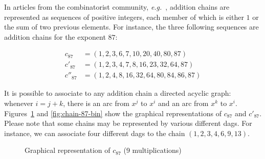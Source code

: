 In articles from the combinatorist  community, 
\emph{e.g.}~\cite{brauer1939,DBLP:journals/ipl/BerstelB87},  addition chains 
are represented as sequences of positive integers, each member of which 
is either $1$ or  the sum of two previous elements.
For instance, the three following sequences are addition chains for the exponent $87$:

\begin{align}
c_{87} &= (1,2,3,6,7,10,20,40,80,87) \\
c'_{87}&=(1,2,3,4,7,8,16,23,32,64,87) \\
c''_{87}&=(1,2,4,8,16,32,64,80,84,86,87)
\end{align}

It is possible to associate to any addition chain a directed acyclic graph:
whenever $i=j+k$, there is an arc from $x^j$ to $x^i$ and an arc
from $x^k$ to $x^i$. Figures~\ref{fig:chain-87-eucl}  and 
\ref{fig:chain-87-bin} show the graphical representations of 
 $c_{87}$  and $c'_{87}$. 
Please note that some chains may be represented by various different dags.
For instance, we can associate four different dags to the chain $(1,2,3,4,6,9,13)$. 


\begin{figure}[h]
  \centering
  
  \caption{Graphical representation of $c_{87}$ (9 multiplications)}
  \label{fig:chain-87-eucl}
\end{figure}

